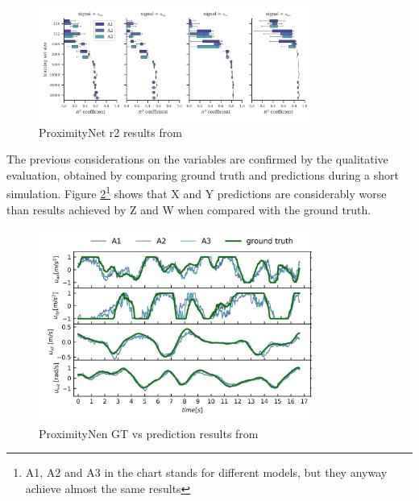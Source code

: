 \begin{figure}[!htb]
	\centering
	\includegraphics[width=0.8\textwidth]{"contents/images/03-proximitynet-r2"}
	\caption[ProximityNet \gls{r2} results from \cite{mantegazza2019visionbased}]{ProximityNet \gls{r2} results from \cite{mantegazza2019visionbased}}
	\label{fig:proximitynet-r2}
\end{figure}

\medskip

The previous considerations on the variables are confirmed by the qualitative evaluation, obtained by comparing ground truth and predictions during a short simulation. Figure \ref{fig:proximitynet-gt-pred}\footnote{A1, A2 and A3 in the chart stands for different models, but they anyway achieve almost the same results} shows that X and Y predictions are considerably worse than results achieved by Z and W when compared with the ground truth.

\begin{figure}[!htb]
	\centering
	\includegraphics[width=0.8\textwidth]{"contents/images/03-proximitynet-gt-pred-2"}
	\caption[ProximityNet GT vs prediction results from \cite{mantegazza2019visionbased}]{ProximityNen GT vs prediction results from \cite{mantegazza2019visionbased}}
	\label{fig:proximitynet-gt-pred}
\end{figure}



